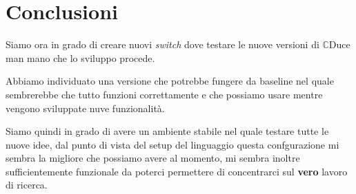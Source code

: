 \documentclass[]{article}
\newcommand{\cduce}{$\mathbb {C}$Duce\xspace}
\begin{document}
\section{Conclusioni}
Siamo ora in grado di creare nuovi \textit{switch} dove testare le nuove versioni di \cduce man mano che lo sviluppo procede.

Abbiamo individuato una versione che potrebbe fungere da baseline nel quale sembrerebbe che tutto funzioni correttamente e che possiamo usare mentre vengono sviluppate nuve funzionalità.

Siamo quindi in grado di avere un ambiente stabile nel quale testare tutte le nuove idee, dal punto di vista del setup del linguaggio questa confgurazione mi sembra la migliore che possiamo avere al momento, mi sembra inoltre sufficientemente funzionale da poterci permettere di concentrarci sul \textbf{vero} lavoro di ricerca.
\end{document}

